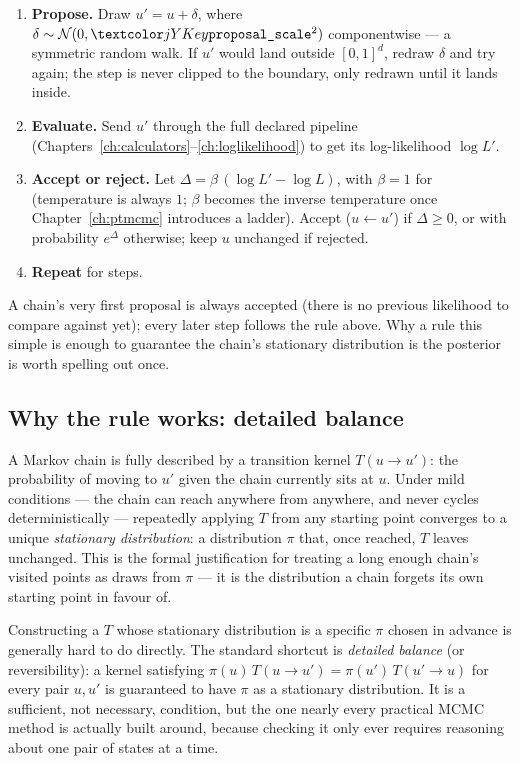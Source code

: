 \begin{enumerate}
  \item \textbf{Propose.} Draw $u' = u + \delta$, where $\delta \sim
        \mathcal{N}(0, \yamlkey{proposal\_scale}^2)$ componentwise --- a symmetric
        random walk\cite{Metropolis:1953,Hastings:1970}. If $u'$ would land outside
        $[0,1]^d$, redraw $\delta$ and try again; the step is never clipped to the
        boundary, only redrawn until it lands inside.
  \item \textbf{Evaluate.} Send $u'$ through the full declared pipeline
        (Chapters~\ref{ch:calculators}--\ref{ch:loglikelihood}) to get its
        log-likelihood $\log L'$.
  \item \textbf{Accept or reject.} Let $\Delta = \beta\,(\log L' - \log L)$, with
        $\beta = 1$ for  (temperature is always $1$; $\beta$ becomes
        the inverse temperature once Chapter~\ref{ch:ptmcmc} introduces a ladder).
        Accept ($u \leftarrow u'$) if $\Delta \geq 0$, or with probability
        $e^{\Delta}$ otherwise; keep $u$ unchanged if rejected.
  \item \textbf{Repeat} for  steps.
\end{enumerate}

A chain's very first proposal is always accepted (there is no previous likelihood to
compare against yet); every later step follows the rule above. Why a rule this simple
is enough to guarantee the chain's stationary distribution is the posterior is worth
spelling out once.

\subsection{Why the rule works: detailed balance}
\label{sec:mcmc-detailed-balance}

A Markov chain is fully described by a transition kernel $T(u \to u')$: the
probability of moving to $u'$ given the chain currently sits at $u$. Under mild
conditions --- the chain can reach anywhere from anywhere, and never cycles
deterministically --- repeatedly applying $T$ from any starting point converges to a
unique \emph{stationary distribution}: a distribution $\pi$ that, once reached, $T$
leaves unchanged. This is the formal justification for treating a long enough
chain's visited points as draws from $\pi$ --- it is the distribution a chain forgets
its own starting point in favour of.

Constructing a $T$ whose stationary distribution is a specific $\pi$ chosen in
advance is generally hard to do directly. The standard shortcut is \emph{detailed
balance} (or reversibility): a kernel satisfying $\pi(u)\,T(u \to u') = \pi(u')\,T(u'
\to u)$ for every pair $u, u'$ is guaranteed to have $\pi$ as a stationary
distribution. It is a sufficient, not necessary, condition, but the one nearly every
practical MCMC method is actually built around, because checking it only ever
requires reasoning about one pair of states at a time\cite{RobertCasella:2004}.

